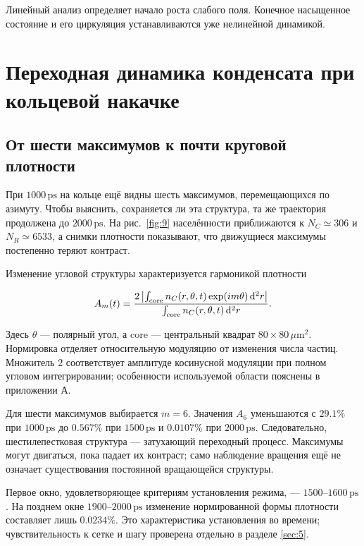 \documentclass[12pt,a4paper]{article}
\begin{document}
Линейный анализ определяет начало роста слабого поля. Конечное насыщенное состояние и его циркуляция устанавливаются уже нелинейной динамикой.

\clearpage

\section{Переходная динамика конденсата при кольцевой накачке}\label{sec:9}

\subsection{От шести максимумов к почти круговой плотности}\label{sec:9.1}

При $1000\,\mathrm{ps}$ на кольце ещё видны шесть максимумов, перемещающихся по азимуту. Чтобы выяснить, сохраняется ли эта структура, та же траектория продолжена до $2000\,\mathrm{ps}$. На рис.~\ref{fig:9} населённости приближаются к $N_{C}\simeq 306$ и $N_{R}\simeq 6533$, а снимки плотности показывают, что движущиеся максимумы постепенно теряют контраст.

Изменение угловой структуры характеризуется гармоникой плотности

\begin{equation}\label{eq:38}
A_m(t)=\frac{2\left|\int_{\rm core} n_C(r,\theta,t)\exp(im\theta)\,\mathrm d^2r\right|}{\int_{\rm core} n_C(r,\theta,t)\,\mathrm d^2r}.\end{equation}

Здесь $\theta$ --- полярный угол, а $\mathrm{core}$ --- центральный квадрат $80 \times 80\,\mu\mathrm m^{2}$. Нормировка отделяет относительную модуляцию от изменения числа частиц. Множитель $2$ соответствует амплитуде косинусной модуляции при полном угловом интегрировании; особенности используемой области пояснены в приложении А.

Для шести максимумов выбирается $m=6$. Значения $A_{6}$ уменьшаются с $29.1\%$ при $1000\,\mathrm{ps}$ до $0.567\%$ при $1500\,\mathrm{ps}$ и $0.0107\%$ при $2000\,\mathrm{ps}$. Следовательно, шестилепестковая структура --- затухающий переходный процесс. Максимумы могут двигаться, пока падает их контраст; само наблюдение вращения ещё не означает существования постоянной вращающейся структуры.

Первое окно, удовлетворяющее критериям установления режима, --- $1500\text{--}1600\,\mathrm{ps}$. На позднем окне $1900\text{--}2000\,\mathrm{ps}$ изменение нормированной формы плотности составляет лишь $0.0234\%$. Это характеристика установления во времени; чувствительность к сетке и шагу проверена отдельно в разделе \ref{sec:5}.
\end{document}
